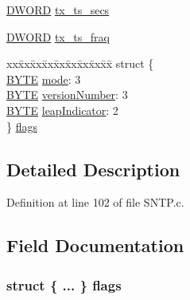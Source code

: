 \begin{DoxyCompactItemize}
\item 
\hyperlink{_generic_type_defs_8h_ad342ac907eb044443153a22f964bf0af}{D\+W\+O\+R\+D} \hyperlink{struct_n_t_p___p_a_c_k_e_t_ab96cffa936cacee59ceee3685ba44237}{tx\+\_\+ts\+\_\+secs}
\item 
\hyperlink{_generic_type_defs_8h_ad342ac907eb044443153a22f964bf0af}{D\+W\+O\+R\+D} \hyperlink{struct_n_t_p___p_a_c_k_e_t_aaeae6816df84561e9a3e03c73924a4f8}{tx\+\_\+ts\+\_\+fraq}
\item 
\begin{tabbing}
xx\=xx\=xx\=xx\=xx\=xx\=xx\=xx\=xx\=\kill
struct \{\\
\>\hyperlink{_generic_type_defs_8h_a4ae1dab0fb4b072a66584546209e7d58}{BYTE} \hyperlink{struct_n_t_p___p_a_c_k_e_t_a4cd01e42a5504c3c394f8dab8f742ef1}{mode}: 3\\
\>\hyperlink{_generic_type_defs_8h_a4ae1dab0fb4b072a66584546209e7d58}{BYTE} \hyperlink{struct_n_t_p___p_a_c_k_e_t_a7487f860e8661c343c34fef877651c8f}{versionNumber}: 3\\
\>\hyperlink{_generic_type_defs_8h_a4ae1dab0fb4b072a66584546209e7d58}{BYTE} \hyperlink{struct_n_t_p___p_a_c_k_e_t_a700d2c16fa60fdc2df8ba1d4ca38d892}{leapIndicator}: 2\\
\} \hyperlink{struct_n_t_p___p_a_c_k_e_t_abcb28f046995c9552c7a63ff9eb83728}{flags}\\

\end{tabbing}\end{DoxyCompactItemize}


\subsection{Detailed Description}


Definition at line 102 of file S\+N\+T\+P.\+c.



\subsection{Field Documentation}
\hypertarget{struct_n_t_p___p_a_c_k_e_t_a1c08ad6e8c807f00f791faa1bb75bf91}{}
\subsubsection[{flags}]{\setlength{\rightskip}{0pt plus 5cm}struct \{ ... \}   flags}\label{struct_n_t_p___p_a_c_k_e_t_a1c08ad6e8c807f00f791faa1bb75bf91}
\hypertarget{struct_n_t_p___p_a_c_k_e_t_abcb28f046995c9552c7a63ff9eb83728}{}
